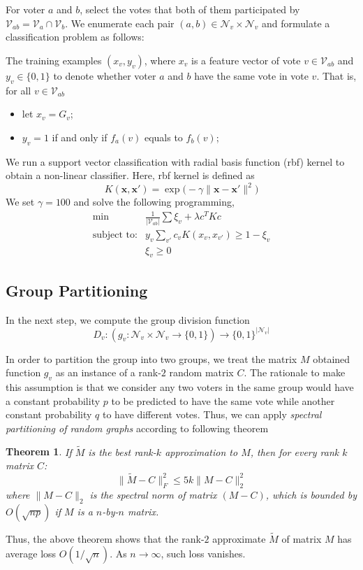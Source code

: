 \documentclass{article} %
\newtheorem{theo}{Theorem}
\begin{document}
For voter $a$ and $b$, select the votes that both of them participated by $\mathcal V_{ab} = \mathcal V_a \cap \mathcal V_b$. We enumerate each pair $(a, b) \in \mathcal N_v \times \mathcal N_v$ and formulate a classification problem as follows:
    
    The training examples $(x_v, y_v)$, where $x_v$ is a feature vector of vote $v \in \mathcal V_{ab}$ and $y_v \in \{0, 1\}$ to denote whether voter $a$ and $b$ have the same vote in vote $v$. That is, for all $v \in \mathcal V_{ab}$
    \begin{itemize}
        \item let $x_v = G_v$;
        \item $y_v = 1$ if and only if $f_a(v)$ equals to $f_b(v)$;   
    \end{itemize}
    
    We run a support vector classification with radial basis function (rbf) kernel to obtain a non-linear classifier. Here, rbf kernel is defined as
    \[
        K(\mathbf x, \mathbf x') = \exp\big( -\gamma \|\mathbf x - \mathbf x'\|^2 \big)
    \]
    We set $\gamma = 100$ and solve the following programming,
    \[
        \begin{array}{rc}
            \min & \frac 1 {|\mathcal V_{ab}|} \sum \xi_v + \lambda c^T K c \\
            \mbox{subject to:} & y_v \sum_{v'} c_v K(x_v, x_{v'}) \geq 1 - \xi_v \\
                & \xi_v \geq 0
        \end{array}
    \]

\subsection{Group Partitioning}
    In the next step, we compute the group division function 
    \[
        D_v : (g_v: \mathcal N_v \times \mathcal N_v \to \{0, 1\}) \to \{0, 1\}^{|\mathcal N_v|}
    \]
    
    In order to partition the group into two groups, we treat the matrix $M$ obtained function $g_v$ as an instance of a rank-$2$ random matrix $C$. The rationale to make this assumption is that we consider any two voters in the same group would have a constant probability $p$ to be predicted to have the same vote while another constant probability $q$ to have different votes. Thus, we can apply {\em spectral partitioning of random graphs} \cite{mcsherry2001spectral} according to following theorem
    \begin{theo}
        If $\tilde M$ is the best rank-$k$ approximation to $M$, then for every rank $k$ matrix $C$:
        \[
            \|\tilde M - C\|_F^2 \leq 5 k \|M - C\|_2^2
        \]
        where $\|M - C\|_2$ is the spectral norm of matrix $(M - C)$, which is bounded by $O(\sqrt{np})$ if $M$ is a $n$-by-$n$ matrix. 
    \end{theo}
    Thus, the above theorem shows that the rank-$2$ approximate $\tilde M$ of matrix $M$ has average loss $O(1 / \sqrt n)$. As $n \to \infty$, such loss vanishes.
\end{document}
